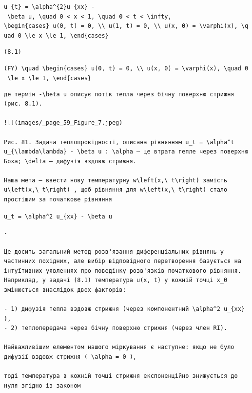 \documentclass[
  ukrainian,
]{article}
\begin{document}
\texttt{u\_\{t\}\ =\ \textbackslash{}alpha\^{}\{2\}u\_\{xx\}\ -\ \textbackslash{}beta\ u,\ \textbackslash{}quad\ 0\ \textless{}\ x\ \textless{}\ 1,\ \textbackslash{}quad\ 0\ \textless{}\ t\ \textless{}\ \textbackslash{}infty,}
\texttt{\textbackslash{}begin\{cases\}\ u(0,\ t)\ =\ 0,\ \textbackslash{}\textbackslash{}\ u(1,\ t)\ =\ 0,\ \textbackslash{}\textbackslash{}\ u(x,\ 0)\ =\ \textbackslash{}varphi(x),\ \textbackslash{}quad\ 0\ \textbackslash{}le\ x\ \textbackslash{}le\ 1,\ \textbackslash{}end\{cases\}}

\begin{verbatim}
(8.1)
\end{verbatim}

\texttt{(FY)\ \textbackslash{}quad\ \textbackslash{}begin\{cases\}\ u(0,\ t)\ =\ 0,\ \textbackslash{}\textbackslash{}\ u(x,\ 0)\ =\ \textbackslash{}varphi(x),\ \textbackslash{}quad\ 0\ \textbackslash{}le\ x\ \textbackslash{}le\ 1,\ \textbackslash{}end\{cases\}}

\begin{verbatim}
де термін -\beta u описує потік тепла через бічну поверхню стрижня (рис. 8.1).

![](images/_page_59_Figure_7.jpeg)

Рис. 81. Задача теплопровідності, описана рівнянням u_t = \alpha^t u_{\lambda\lambda} - \beta u : \alpha — це втрата гепле через поверхню Боха; \delta – дифузія вздовж стрижня.

Наша мета — ввести нову температурну w\left(x,\ t\right) замість u\left(x,\ t\right) , щоб рівняння для w\left(x,\ t\right) стало простішим за початкове рівняння
\end{verbatim}

\texttt{u\_t\ =\ \textbackslash{}alpha\^{}2\ u\_\{xx\}\ -\ \textbackslash{}beta\ u}

\begin{verbatim}
.

Це досить загальний метод розв'язання диференціальних рівнянь у частинних похідних, але вибір відповідного перетворення базується на інтуїтивних уявленнях про поведінку розв'язків початкового рівняння. Наприклад, у задачі (8.1) температура u(x, t) у кожній точці x_0 змінюється внаслідок двох факторів:

- 1) дифузія тепла вздовж стрижня (через компонентний \alpha^2 u_{xx} ),
- 2) теплопередача через бічну поверхню стрижня (через член RI).

Найважливішим елементом нашого міркування є наступне: якщо не було дифузії вздовж стрижня ( \alpha = 0 ),

тоді температура в кожній точці стрижня експоненційно знижується до нуля згідно із законом
\end{verbatim}
\end{document}
